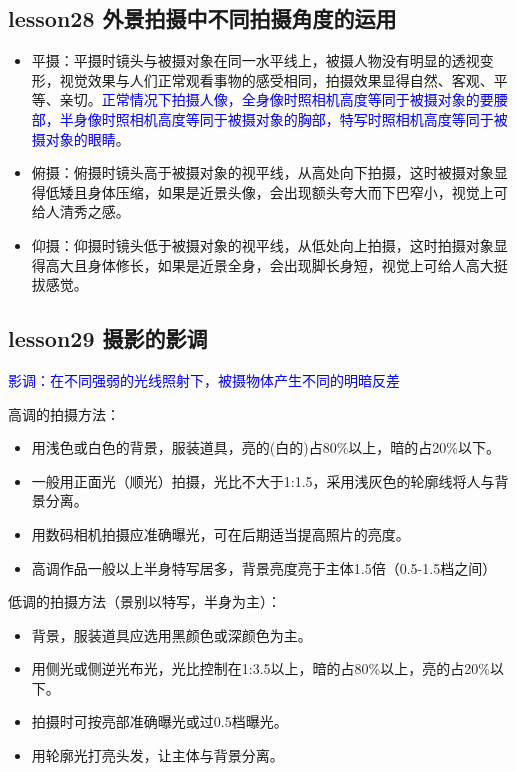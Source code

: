 \documentclass{book}
\begin{document}
\subsection{lesson28 外景拍摄中不同拍摄角度的运用}

\begin{itemize}
  \item 平摄：平摄时镜头与被摄对象在同一水平线上，被摄人物没有明显的透视变形，视觉效果与人们正常观看事物的感受相同，拍摄效果显得自然、客观、平等、亲切。\textcolor{blue}{正常情况下拍摄人像，全身像时照相机高度等同于被摄对象的要腰部，半身像时照相机高度等同于被摄对象的胸部，特写时照相机高度等同于被摄对象的眼睛}。
  \item 俯摄：俯摄时镜头高于被摄对象的视平线，从高处向下拍摄，这时被摄对象显得低矮且身体压缩，如果是近景头像，会出现额头夸大而下巴窄小，视觉上可给人清秀之感。
  \item 仰摄：仰摄时镜头低于被摄对象的视平线，从低处向上拍摄，这时拍摄对象显得高大且身体修长，如果是近景全身，会出现脚长身短，视觉上可给人高大挺拔感觉。
\end{itemize}

\subsection{lesson29 摄影的影调}

\textcolor{blue}{影调：在不同强弱的光线照射下，被摄物体产生不同的明暗反差}

高调的拍摄方法：\begin{itemize}
          \item 用浅色或白色的背景，服装道具，亮的(白的)占80\%以上，暗的占20\%以下。
          \item 一般用正面光（顺光）拍摄，光比不大于1:1.5，采用浅灰色的轮廓线将人与背景分离。
          \item 用数码相机拍摄应准确曝光，可在后期适当提高照片的亮度。
          \item 高调作品一般以上半身特写居多，背景亮度亮于主体1.5倍（0.5-1.5档之间）
        \end{itemize}
        
低调的拍摄方法（景别以特写，半身为主）：\begin{itemize}
          \item 背景，服装道具应选用黑颜色或深颜色为主。
          \item 用侧光或侧逆光布光，光比控制在1:3.5以上，暗的占80\%以上，亮的占20\%以下。
          \item 拍摄时可按亮部准确曝光或过0.5档曝光。
          \item 用轮廓光打亮头发，让主体与背景分离。
        \end{itemize}
\end{document}
